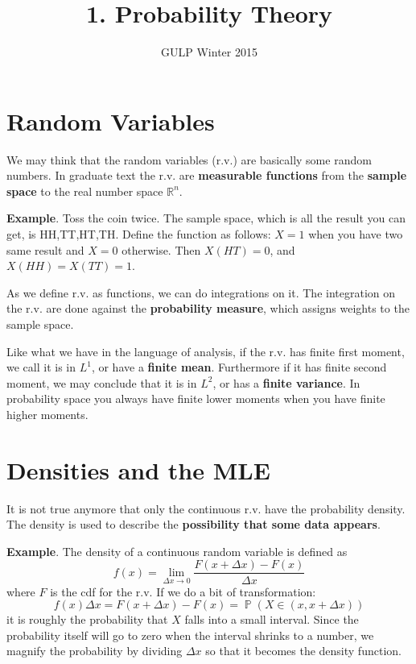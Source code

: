 \documentclass[12pt]{article}
\newcommand{\1}{\mathbbm{1}}
\renewcommand{\P}{\operatorname{\mathbb{P}}}
\begin{document}
\title{1. Probability Theory}%
\author{GULP Winter 2015} %
\maketitle

\section{Random Variables}

We may think that the random variables (r.v.) are basically some random numbers. In graduate text the r.v. are \textbf{measurable functions} from the \textbf{sample space} to the real number space $\mathbb{R}^n$.

\textbf{Example}. Toss the coin twice. The sample space, which is all the result you can get, is {HH,TT,HT,TH}. Define the function as follows: $X = 1$ when you have two same result and $X = 0$ otherwise. Then $X(HT) = 0$, and $X(HH) = X(TT) = 1$.

As we define r.v. as functions, we can do integrations on it. The integration on the r.v. are done against the \textbf{probability measure}, which assigns weights to the sample space.

Like what we have in the language of analysis, if the r.v. has finite first moment, we call it is in $L^1$, or have a \textbf{finite mean}. Furthermore if it has finite second moment, we may conclude that it is in $L^2$, or has a \textbf{finite variance}. In probability space you always have finite lower moments when you have finite higher moments.

\section{Densities and the MLE}

It is not true anymore that only the continuous r.v. have the probability density. The density is used to describe the \textbf{possibility that some data appears}.

\textbf{Example}. The density of a continuous random variable is defined as
$$
f(x) = \lim_{\Delta x \rightarrow 0} \frac{F(x + \Delta x) - F(x)}{\Delta x}
$$
where $F$ is the cdf for the r.v. If we do a bit of transformation:
$$
f(x) \Delta x = F(x + \Delta x) - F(x) = \P (X \in (x, x + \Delta x))
$$
it is roughly the probability that $X$ falls into a small interval. Since the probability itself will go to zero when the interval shrinks to a number, we magnify the probability by dividing $\Delta x$ so that it becomes the density function.
\end{document}
